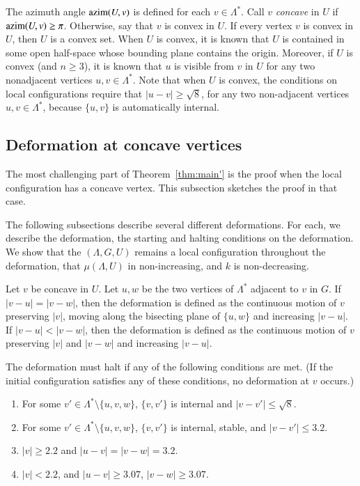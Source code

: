 \documentclass{article} %
\begin{document}
The azimuth angle ${\operatorname{azim}}(U,v)$ is defined for each
$v\in\Lambda^*$. Call $v$ {\it concave} in $U$ if
${\operatorname{azim}}(U,v)\ge\pi$. Otherwise, say that $v$ is convex in $U$. If
every vertex $v$ is convex in $U$, then $U$ is a convex set. When $U$
is convex, it is known that $U$ is contained in some open half-space
whose bounding plane contains the origin. Moreover, if $U$ is convex
(and $n\ge 3$), it is known that $u$ is visible from $v$ in $U$ for
any two nonadjacent vertices $u,v\in\Lambda^*$. Note that when $U$ is
convex, the conditions on local configurations require that
$|u-v|\ge\sqrt8$, for any two non-adjacent vertices $u,v\in\Lambda^*$,
because $\{u,v\}$ is automatically internal.

\subsection{Deformation at concave vertices}\label{sec:concave}

The most challenging part  of Theorem~\ref{thm:main'} is the
proof when the local configuration has a concave vertex.  This subsection
sketches the proof in that case.

The following subsections describe several different  deformations.  For each,
we describe the deformation, the starting and halting conditions on 
the deformation.  We show that the $(\Lambda,G,U)$ remains a local
configuration throughout the deformation, 
 that  $\mu(\Lambda,U)$ in non-increasing, and $k$ is
non-decreasing.

Let $v$ be concave in $U$.  Let $u,w$ be the two vertices of
$\Lambda^*$ adjacent to $v$ in $G$. 
If $|v-u|=|v-w|$, then the deformation is defined as the continuous motion
of $v$ preserving $|v|$,  moving along the bisecting plane of $\{u,w\}$
and increasing $|v-u|$.  If $|v-u|<|v-w|$, then the deformation
is defined as the continuous motion of $v$ preserving $|v|$ and
$|v-w|$ and increasing $|v-u|$.

The deformation must halt if any of the following conditions
are met.  (If the initial configuration satisfies any of these conditions,
no deformation at $v$ occurs.)
\begin{enumerate}\label{e:halt}
\item For some $v'\in\Lambda^*\setminus\{u,v,w\}$, 
$\{v,v'\}$ is internal and $|v-v'|\le \sqrt8$.
\item For some $v'\in\Lambda^*\setminus\{u,v,w\}$,
$\{v,v'\}$ is internal, stable, and $|v-v'|\le 3.2$.
\item $|v|\ge 2.2$ and $|u-v|=|v-w|=3.2$.  
\item $|v|< 2.2$, 
and $|u-v|\ge 3.07$, $|v-w|\ge 3.07$.
\end{enumerate}
\end{document}
